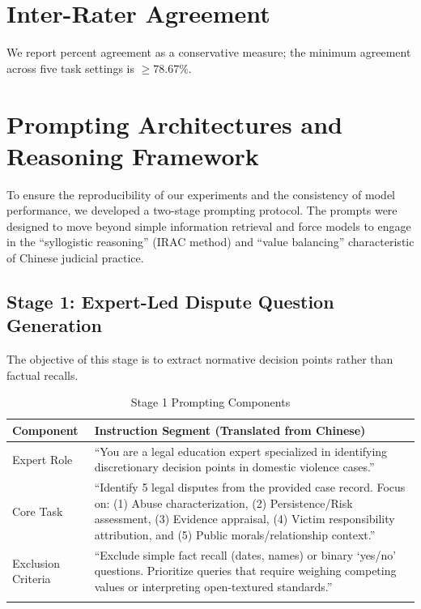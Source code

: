 \documentclass[pdflatex,sn-mathphys-ay]{sn-jnl}%
\theoremstyle{thmstyleone}%
\theoremstyle{thmstyletwo}%
\theoremstyle{thmstylethree}%
\begin{document}
\begin{appendices}

\section{Inter-Rater Agreement}\label{sec:appendix-agreement}
\FloatBarrier
We report percent agreement as a conservative measure; the minimum agreement across five task settings is $\geq 78.67\%$.

\section{Prompting Architectures and Reasoning Framework}\label{sec:appendix-prompting}
\FloatBarrier
To ensure the reproducibility of our experiments and the consistency of model performance, we developed a two-stage prompting protocol. The prompts were designed to move beyond simple information retrieval and force models to engage in the ``syllogistic reasoning'' (IRAC method) and ``value balancing'' characteristic of Chinese judicial practice.

\subsection{Stage 1: Expert-Led Dispute Question Generation}

The objective of this stage is to extract normative decision points rather than factual recalls.

\begin{table}[h]
\caption{Stage 1 Prompting Components}\label{tab:stage1-prompt}
\begin{tabular}{@{}lp{10cm}@{}}
\toprule
\textbf{Component} & \textbf{Instruction Segment (Translated from Chinese)} \\
\midrule
Expert Role & ``You are a legal education expert specialized in identifying discretionary decision points in domestic violence cases.'' \\
Core Task & ``Identify 5 legal disputes from the provided case record. Focus on: (1) Abuse characterization, (2) Persistence/Risk assessment, (3) Evidence appraisal, (4) Victim responsibility attribution, and (5) Public morals/relationship context.'' \\
Exclusion Criteria & ``Exclude simple fact recall (dates, names) or binary `yes/no' questions. Prioritize queries that require weighing competing values or interpreting open-textured standards.'' \\
\botrule
\end{tabular}
\end{table}


\end{appendices}
\end{document}
